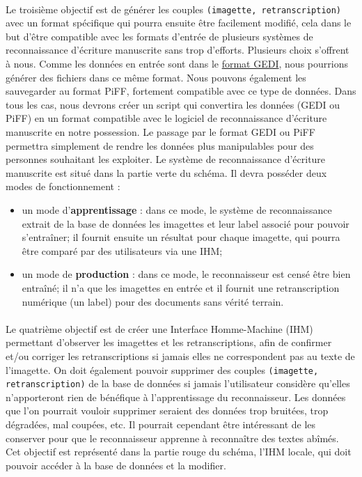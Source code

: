 \paragraph{}
Le troisième objectif est de générer les couples \texttt{(imagette, retranscription)} avec un format spécifique
qui pourra ensuite être facilement modifié, cela dans le but d’être compatible avec les formats d’entrée de
plusieurs systèmes de reconnaissance d’écriture manuscrite sans trop d’efforts.
Plusieurs choix s’offrent à nous. Comme les données en entrée sont dans le
\href{https://lampsrv02.umiacs.umd.edu/projdb/project.php?id=53}{format GEDI}, nous pourrions générer des
fichiers dans ce même format. Nous pouvons également les sauvegarder au format PiFF\cite{piff:2017},
fortement compatible avec ce type de données. Dans tous les cas, nous devrons créer un script qui
convertira les données (GEDI ou PiFF) en un format compatible avec le logiciel de reconnaissance d’écriture
manuscrite en notre possession. Le passage par le format GEDI ou PiFF permettra simplement de rendre les données
plus manipulables pour des personnes souhaitant les exploiter. Le système de reconnaissance d’écriture manuscrite
est situé dans la partie verte du schéma. Il devra posséder deux modes de fonctionnement :

\begin{itemize}
\item un mode d’\textbf{apprentissage} : dans ce mode, le système de reconnaissance extrait de la base de données les
imagettes et leur label associé pour pouvoir s'entraîner; il fournit ensuite un résultat pour chaque imagette,
qui pourra être comparé par des utilisateurs via une IHM;
\item un mode de \textbf{production} : dans ce mode, le reconnaisseur est censé être bien entraîné; il n’a que les
imagettes en entrée et il fournit une retranscription numérique (un label) pour des documents sans vérité terrain.
\end{itemize}

\paragraph{}
Le quatrième objectif est de créer une Interface Homme-Machine (IHM) permettant d’observer les imagettes
et les retranscriptions, afin de confirmer et/ou corriger les retranscriptions si jamais elles ne correspondent
pas au texte de l’imagette. On doit également pouvoir supprimer des couples \texttt{(imagette, retranscription)}
de la base de données si jamais l’utilisateur considère qu’elles n’apporteront rien de bénéfique
à l’apprentissage du reconnaisseur. Les données que l'on pourrait vouloir supprimer seraient des
données trop bruitées, trop dégradées, mal coupées, etc. Il pourrait cependant être intéressant
de les conserver pour que le reconnaisseur apprenne à reconnaître des textes abîmés. Cet objectif est représenté
dans la partie rouge du schéma, l'IHM locale, qui doit pouvoir accéder à la base de données et la modifier.

